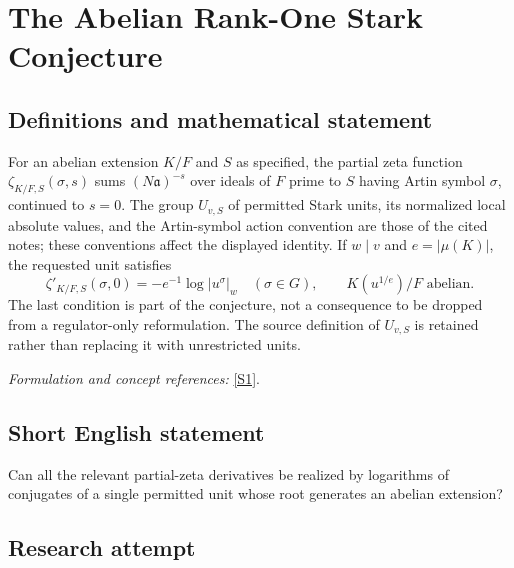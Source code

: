 \documentclass[11pt,a4paper]{article}
\newcommand{\sref}[2]{\hyperlink{source:#1:#2}{[S#2]}}
\newif\ifshowcatalogue
\newcommand{\cataloguescope}[1]{\ifshowcatalogue
 \paragraph{Exact scope in the supplied catalogue.}
 \begin{quote}\small #1\end{quote}\fi}
\numberwithin{equation}{section}
\begin{document}
\setcounter{section}{0}
\clearpage
\section*{\texorpdfstring{The Abelian Rank-One Stark Conjecture}{The Abelian Rank-One Stark Conjecture}}\label{30001846}
\subsection{Definitions and mathematical statement}
For an abelian extension $K/F$ and $S$ as specified, the partial zeta function $\zeta_{K/F,S}(\sigma,s)$ sums $(N\mathfrak a)^{-s}$ over ideals of $F$ prime to $S$ having Artin symbol $\sigma$, continued to $s=0$. The group $U_{v,S}$ of permitted Stark units, its normalized local absolute values, and the Artin-symbol action convention are those of the cited notes; these conventions affect the displayed identity. If $w\mid v$ and $e=|\mu(K)|$, the requested unit satisfies
\[
 \zeta'_{K/F,S}(\sigma,0)=-e^{-1}\log|u^\sigma|_w
 \quad(\sigma\in G),\qquad K(u^{1/e})/F\text{ abelian}.
\]
The last condition is part of the conjecture, not a consequence to be dropped from a regulator-only reformulation. The source definition of $U_{v,S}$ is retained rather than replacing it with unrestricted units.
\par\smallskip\textit{Formulation and concept references:} \sref{30001846}{1}.
\cataloguescope{Let K/F be an abelian extension of number fields with Galois group G, and let S be a finite set of places of F containing the archimedean and ramified places, with |S| >= 2 and at least one place v of S splitting completely in K. Prove that, for a fixed place w of K above v, there exists a unit u in U\_\{v,S\} such that zeta'\_\{K/F,S\}(sigma, 0) = -(1/e) log |u\textasciicircum{}sigma|\_w for all sigma in G, where e is the number of roots of unity in K, and K(u\textasciicircum{}\{1/e\})/F is abelian.}
\subsection{Short English statement}
Can all the relevant partial-zeta derivatives be realized by logarithms of conjugates of a single permitted unit whose root generates an abelian extension?
\subsection{Research attempt}
\end{document}
